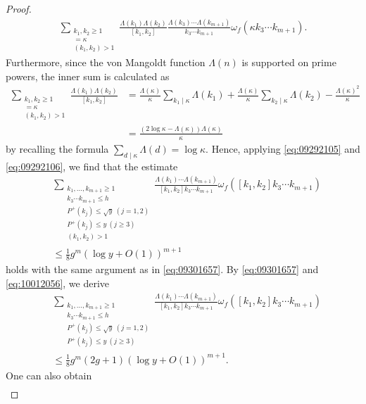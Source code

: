 \documentclass[a4paper,11pt]{amsart}
\theoremstyle{definition}
\numberwithin{equation}{section}
\begin{document}
\begin{proof}
\begin{align*}
\sum_{\substack{k_1,k_2 \geq1 \\ [k_1,k_2]=\kappa \\ (k_1,k_2)>1}} \frac{\Lambda(k_1)\Lambda(k_2)}{[k_1,k_2]}
\frac{\Lambda(k_3) \cdots \Lambda(k_{m+1})}{k_3 \cdots k_{m+1}} \omega_f(\kappa k_3 \cdots k_{m+1}). 
\end{align*}
Furthermore, since the von Mangoldt function $\Lambda(n)$ is supported on prime powers, the inner sum is calculated as
\begin{align*}
\sum_{\substack{k_1,k_2 \geq1 \\ [k_1,k_2]=\kappa \\ (k_1,k_2)>1}} \frac{\Lambda(k_1)\Lambda(k_2)}{[k_1,k_2]}
&= \frac{\Lambda(\kappa)}{\kappa} \sum_{k_1 \mid \kappa} \Lambda(k_1)
+ \frac{\Lambda(\kappa)}{\kappa} \sum_{k_2 \mid \kappa} \Lambda(k_2)
- \frac{\Lambda(\kappa)^2}{\kappa} \\
&= \frac{(2\log{\kappa}-\Lambda(\kappa)) \Lambda(\kappa)}{\kappa}
\end{align*}
by recalling the formula $\sum_{d \mid \kappa} \Lambda(d)=\log{\kappa}$. 
Hence, applying \eqref{eq:09292105} and \eqref{eq:09292106}, we find that the estimate
\begin{align}\label{eq:10012056}
&\sum_{\substack{k_1,\ldots,k_{m+1} \geq 1 \\ [k_1,k_2]k_3 \cdots k_{m+1} \leq h \\ P^+(k_j) \leq \sqrt{y} ~(j=1,2) \\ P^+(k_j) \leq y ~(j \geq 3) \\ (k_1,k_2)>1}} 
\frac{\Lambda(k_1) \cdots \Lambda(k_{m+1})}{[k_1,k_2]k_3 \cdots k_{m+1}} \omega_f([k_1,k_2]k_3 \cdots k_{m+1}) \\
&\leq \frac{1}{8} g^m (\log{y}+O(1))^{m+1} \nonumber 
\end{align}
holds with the same argument as in \eqref{eq:09301657}. 
By \eqref{eq:09301657} and \eqref{eq:10012056}, we derive
\begin{align*}
&\sum_{\substack{k_1,\ldots,k_{m+1} \geq 1 \\ [k_1,k_2]k_3 \cdots k_{m+1} \leq h \\ P^+(k_j) \leq \sqrt{y} ~(j=1,2) \\ P^+(k_j) \leq y ~(j \geq 3)}} 
\frac{\Lambda(k_1) \cdots \Lambda(k_{m+1})}{[k_1,k_2]k_3 \cdots k_{m+1}} \omega_f([k_1,k_2]k_3 \cdots k_{m+1}) \\
&\leq \frac{1}{8} g^m(2g+1) (\log{y}+O(1))^{m+1}. 
\end{align*}
One can also obtain
\begin{align}\label{eq:10012104}

\end{align}
\end{proof}
\end{document}
